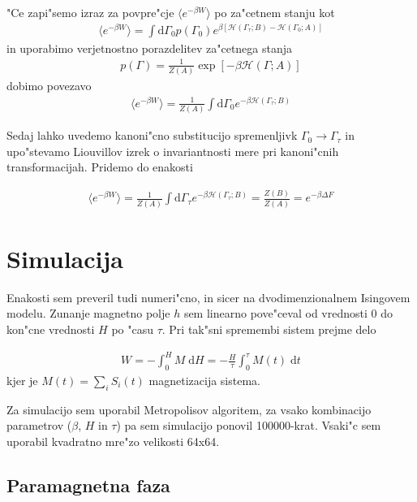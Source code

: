 \documentclass[a4paper,10pt]{article}
\begin{document}
"Ce zapi"semo izraz za povpre"cje $\langle e^{-\beta W}\rangle$ po za"cetnem stanju kot
\begin{align}
 \langle e^{-\beta W}\rangle = \int \mathrm{d}\Gamma_0 p(\Gamma_0) e^{\beta [\mathcal{H}(\Gamma_\tau; B) - \mathcal{H}(\Gamma_0; A)]}
\end{align}
in uporabimo verjetnostno porazdelitev za"cetnega stanja
\begin{align}
 p(\Gamma) = \frac{1}{Z(A)} \exp\left[-\beta \mathcal{H}(\Gamma; A)\right]
\end{align}
dobimo povezavo
\begin{align}
 \langle e^{-\beta W}\rangle = \frac{1}{Z(A)}\int \mathrm{d}\Gamma_0 e^{-\beta\mathcal{H}(\Gamma_\tau; B)} 
\end{align}

Sedaj lahko uvedemo kanoni"cno substitucijo spremenljivk $\Gamma_0 \to \Gamma_\tau$ in upo"stevamo Liouvillov izrek o invariantnosti mere pri kanoni"cnih transformacijah. Pridemo do enakosti

\begin{align}
  \langle e^{-\beta W}\rangle = \frac{1}{Z(A)}\int \mathrm{d}\Gamma_\tau e^{-\beta\mathcal{H}(\Gamma_\tau; B)} = \frac{Z(B)}{Z(A)} = e^{-\beta \Delta F}
\end{align}

\section{Simulacija}

Enakosti sem preveril tudi numeri"cno, in sicer na dvodimenzionalnem Isingovem modelu. Zunanje magnetno polje $h$ sem linearno pove"ceval od vrednosti 0 do kon"cne vrednosti $H$ po "casu $\tau$. Pri tak"sni spremembi sistem prejme delo

\begin{align}
 W = -\int_0^H M \;\mathrm{d}H = -\frac{H}{\tau} \int_0^\tau M(t) \; \mathrm{d}t
\end{align}
kjer je $M(t) = \sum_i S_i(t)$ magnetizacija sistema. 

Za simulacijo sem uporabil Metropolisov algoritem, za vsako kombinacijo parametrov ($\beta$, $H$ in $\tau$) pa sem simulacijo ponovil 100000-krat. Vsaki"c sem uporabil kvadratno mre"zo velikosti 64x64. 

\subsection{Paramagnetna faza}
\end{document}

